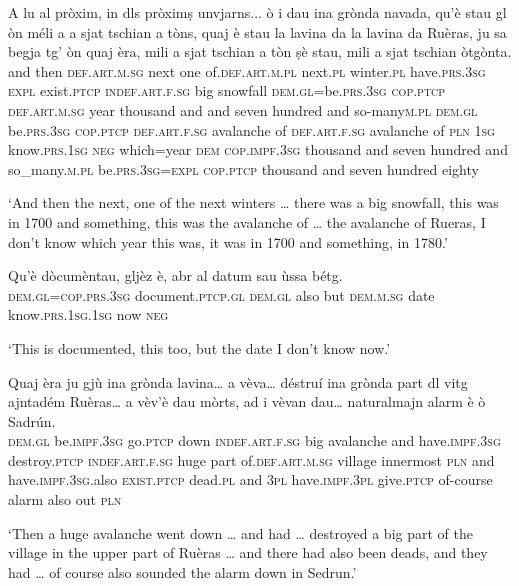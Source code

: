 \begin{linenumbers}
\gll    A lu al pròxim, in dls pròximṣ unvjarns... ò i dau ina grònda navada, qu’è stau gl òn méli a a sjat tschian a tòns, quaj è stau la lavina da la lavina da Ruèras, ju sa begja tg’ òn quaj èra, mili a sjat tschian a tòn ṣè stau, mili a sjat tschian òtgònta.\\
and then \textsc{def.art.m.sg} next one of.\textsc{def.art.m.pl} next.\textsc{pl} winter.\textsc{pl}  have.\textsc{prs.3sg} \textsc{expl} exist.\textsc{ptcp} \textsc{indef.art.f.sg} big snowfall \textsc{dem.gl}=be.\textsc{prs.3sg} \textsc{cop.ptcp} \textsc{def.art.m.sg} year thousand and and seven hundred and   so-many\textsc{m.pl} \textsc{dem.gl} be.\textsc{prs.3sg} \textsc{cop.ptcp}  \textsc{def.art.f.sg} avalanche of \textsc{def.art.f.sg} avalanche of \textsc{pln} \textsc{1sg}  know.\textsc{prs.1sg} \textsc{neg} which=year \textsc{dem} \textsc{cop.impf.3sg} thousand and seven hundred and so\_many.\textsc{m.pl} be.\textsc{prs.3sg=expl} \textsc{cop.ptcp} thousand and seven hundred eighty\\
\end{linenumbers}
\medskip 
\glt `And then the next, one of the next winters … there was a big snowfall, this was in 1700 and something, this was the avalanche of … the avalanche of Rueras, I don’t know which year this was, it was in 1700 and something, in 1780.'
\medskip

\begin{linenumbers}
\gll    Qu’è dòcumèntau, gljèz è, abr al datum sau ùssa bétg. \\
\textsc{dem.gl=cop.prs.3sg} document.\textsc{ptcp.gl} \textsc{dem.gl} also but \textsc{dem.m.sg} date know.\textsc{prs.1sg.1sg} now \textsc{neg}\\
\end{linenumbers}
\medskip
\glt `This is documented, this too, but the date I don’t know now.'
\medskip

\begin{linenumbers}
\gll    Quaj èra ju gjù ina grònda lavina… a vèva… déstruí ina grònda part dl vitg ajntadém Ruèras… a vèv’è dau mòrts, ad i vèvan dau… naturalmajn alarm è ò Sadrún.\\
\textsc{dem.gl} be.\textsc{impf.3sg} go.\textsc{ptcp} down \textsc{indef.art.f.sg} big avalanche and have.\textsc{impf.3sg} destroy.\textsc{ptcp} \textsc{indef.art.f.sg} huge part of.\textsc{def.art.m.sg} village innermost \textsc{pln} and have.\textsc{impf.3sg}.also \textsc{exist.ptcp} dead.\textsc{pl} and \textsc{3pl} have.\textsc{impf.3pl} give.\textsc{ptcp} of-course alarm also out \textsc{pln}\\
\end{linenumbers}
\medskip
\glt `Then a huge avalanche went down … and had … destroyed a big part of the village in the upper part of Ruèras … and there had also been deads, and they had … of course also sounded the alarm down in Sedrun.'
\medskip

